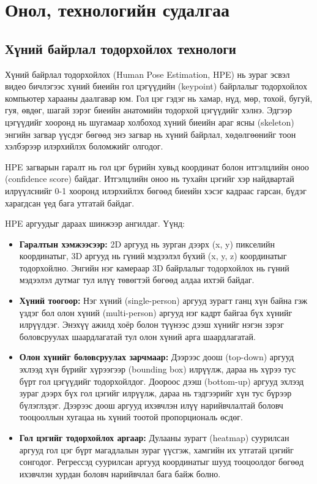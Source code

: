 \chapter{Онол, технологийн судалгаа}
\section{Хүний байрлал тодорхойлох технологи}

Хүний байрлал тодорхойлох (Human Pose Estimation, HPE) нь зураг эсвэл видео бичлэгээс хүний биеийн гол цэгүүдийн (keypoint) байрлалыг тодорхойлох компьютер харааны даалгавар юм. Гол цэг гэдэг нь хамар, нүд, мөр, тохой, бугуй, гуя, өвдөг, шагай зэрэг биеийн анатомийн тодорхой цэгүүдийг хэлнэ. Эдгээр цэгүүдийг хооронд нь шугамаар холбоход хүний биеийн араг ясны (skeleton) энгийн загвар үүсдэг бөгөөд энэ загвар нь хүний байрлал, хөдөлгөөнийг тоон хэлбэрээр илэрхийлэх боломжийг олгодог.

HPE загварын гаралт нь гол цэг бүрийн хувьд координат болон итгэлцлийн оноо (confidence score) байдаг. Итгэлцлийн оноо нь тухайн цэгийг хэр найдвартай илрүүлснийг 0-1 хооронд илэрхийлэх бөгөөд биеийн хэсэг кадраас гарсан, бүдэг харагдсан үед бага утгатай байдаг.

HPE аргуудыг дараах шинжээр ангилдаг. Үүнд:

\begin{itemize}
\item
  \textbf{Гаралтын хэмжээсээр:} 2D аргууд нь зурган дээрх (x, y) пикселийн координатыг, 3D аргууд нь гүний мэдээлэл бүхий (x, y, z) координатыг тодорхойлно. Энгийн нэг камераар 3D байрлалыг тодорхойлох нь гүний мэдээлэл дутмаг тул илүү төвөгтэй бөгөөд алдаа ихтэй байдаг.
\item
  \textbf{Хүний тоогоор:} Нэг хүний (single-person) аргууд зурагт ганц хүн байна гэж үздэг бол олон хүний (multi-person) аргууд нэг кадрт байгаа бүх хүнийг илрүүлдэг. Энэхүү ажилд хоёр болон түүнээс дээш хүнийг нэгэн зэрэг боловсруулах шаардлагатай тул олон хүний арга шаардлагатай.
\item
  \textbf{Олон хүнийг боловсруулах зарчмаар:} Дээрээс доош (top-down) аргууд эхлээд хүн бүрийг хүрээгээр (bounding box) илрүүлж, дараа нь хүрээ тус бүрт гол цэгүүдийг тодорхойлдог. Доороос дээш (bottom-up) аргууд эхлээд зураг дээрх бүх гол цэгийг илрүүлж, дараа нь тэдгээрийг хүн тус бүрээр бүлэглэдэг. Дээрээс доош аргууд ихэвчлэн илүү нарийвчлалтай боловч тооцооллын хугацаа нь хүний тоотой пропорциональ өсдөг.
\item
  \textbf{Гол цэгийг тодорхойлох аргаар:} Дулааны зурагт (heatmap) суурилсан аргууд гол цэг бүрт магадлалын зураг үүсгэж, хамгийн их утгатай цэгийг сонгодог. Регрессэд суурилсан аргууд координатыг шууд тооцоолдог бөгөөд ихэвчлэн хурдан боловч нарийвчлал бага байж болно.
\end{itemize}

